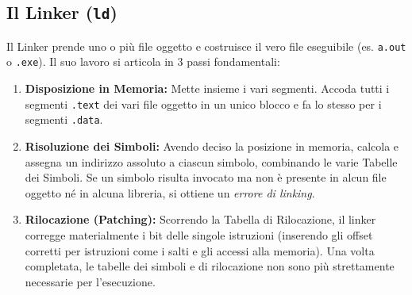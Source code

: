 \documentclass[12pt, a4paper]{article}
\begin{document}
\subsection{Il Linker (\texttt{ld})}
Il Linker prende uno o più file oggetto e costruisce il vero file eseguibile (es. \texttt{a.out} o \texttt{.exe}). Il suo lavoro si articola in 3 passi fondamentali:
\begin{enumerate}
    \item \textbf{Disposizione in Memoria:} Mette insieme i vari segmenti. Accoda tutti i segmenti \texttt{.text} dei vari file oggetto in un unico blocco e fa lo stesso per i segmenti \texttt{.data}.
    \item \textbf{Risoluzione dei Simboli:} Avendo deciso la posizione in memoria, calcola e assegna un indirizzo assoluto a ciascun simbolo, combinando le varie Tabelle dei Simboli. Se un simbolo risulta invocato ma non è presente in alcun file oggetto né in alcuna libreria, si ottiene un \textit{errore di linking}.
    \item \textbf{Rilocazione (Patching):} Scorrendo la Tabella di Rilocazione, il linker corregge materialmente i bit delle singole istruzioni (inserendo gli offset corretti per istruzioni come i salti e gli accessi alla memoria). Una volta completata, le tabelle dei simboli e di rilocazione non sono più strettamente necessarie per l'esecuzione.
\end{enumerate}
\end{document}
